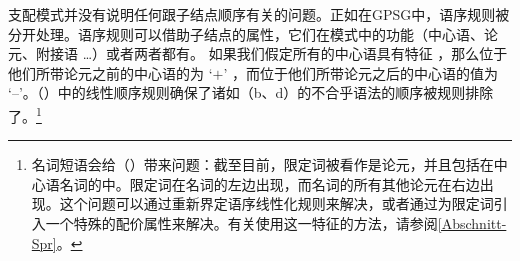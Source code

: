 支配模式并没有说明任何跟子结点顺序有关的问题\indexgpsgc。正如在GPSG中，语序规则被分开处理。语序规则可以借助子结点的属性，它们在模式中的功能（中心语、论元、附接语 \ldots）或者两者都有。
如果我们假定所有的中心语具有特征\initial{} ，那么位于他们所带论元之前的中心语的\initialvc 为 `$+$' ，而位于他们所带论元之后的中心语的值为 `--'。（）中的线性顺序规则确保了诸如（b、d）的不合乎语法的顺序被规则排除了。\footnote{%
  名词短语会给（）带来问题：截至目前，限定词被看作是论元，并且包括在中心语名词的\subcatlc 中。限定词在名词的左边出现，而名词的所有其他论元在右边出现。这个问题可以通过重新界定语序线性化规则\citep[--165]{Mueller99a}来解决，或者通过为限定词引入一个特殊的配价属性来解决\citep[\S~9.4]{ps2}。有关使用这一特征的方法，请参阅\ref{Abschnitt-Spr}。
}

